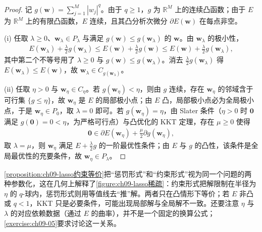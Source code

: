 \documentclass[../../main.tex]{subfiles}
\begin{document}
\begin{proof}
记 $g(\boldsymbol{w})=\sum_{j=1}^{M}|w_{j}|^{q}$。由于 $q\geqslant1$，$g$ 为 $\mathbb{R}^{M}$ 上的连续凸函数；由于 $E$ 为 $\mathbb{R}^{M}$ 上的有限凸函数，$E$ 连续，且其凸分析次微分 $\partial E(\boldsymbol{w})$ 在每点非空。

(i) 任取 $\lambda\geqslant0$、$\boldsymbol{w}_{\lambda}\in P_{\lambda}$ 与满足 $g(\boldsymbol{w})\leqslant g(\boldsymbol{w}_{\lambda})$ 的 $\boldsymbol{w}$。由 $\boldsymbol{w}_{\lambda}$ 的极小性，
\begin{align*}
E(\boldsymbol{w}_{\lambda})+\frac{\lambda}{2}g(\boldsymbol{w}_{\lambda})\leqslant E(\boldsymbol{w})+\frac{\lambda}{2}g(\boldsymbol{w})\leqslant E(\boldsymbol{w})+\frac{\lambda}{2}g(\boldsymbol{w}_{\lambda}),
\end{align*}
其中第二个不等号用了 $\lambda\geqslant0$ 与 $g(\boldsymbol{w})\leqslant g(\boldsymbol{w}_{\lambda})$。消去 $\frac{\lambda}{2}g(\boldsymbol{w}_{\lambda})$ 得 $E(\boldsymbol{w}_{\lambda})\leqslant E(\boldsymbol{w})$，故 $\boldsymbol{w}_{\lambda}\in C_{g(\boldsymbol{w}_{\lambda})}$。

(ii) 任取 $\eta>0$ 与 $\boldsymbol{w}_{\eta}\in C_{\eta}$。若 $g(\boldsymbol{w}_{\eta})<\eta$，则由 $g$ 连续，存在 $\boldsymbol{w}_{\eta}$ 的邻域含于可行集 $\{g\leqslant\eta\}$，故 $\boldsymbol{w}_{\eta}$ 是 $E$ 的局部极小点；由 $E$ 凸，局部极小点必为全局极小点，于是 $\boldsymbol{w}_{\eta}\in P_{0}$，取 $\lambda=0$ 即可。若 $g(\boldsymbol{w}_{\eta})=\eta$，由 Slater 条件（$\eta>0$ 时 $\boldsymbol{0}$ 满足 $g(\boldsymbol{0})=0<\eta$，为严格可行点）与凸优化的 KKT 定理，存在 $\mu\geqslant0$ 使得
\begin{align*}
\boldsymbol{0}\in\partial E(\boldsymbol{w}_{\eta})+\frac{\mu}{2}\partial g(\boldsymbol{w}_{\eta}),
\end{align*}
取 $\lambda=\mu$，则 $\boldsymbol{w}_{\eta}$ 满足 $E+\frac{\lambda}{2}g$ 的一阶最优性条件；由 $E$ 与 $g$ 的凸性，该条件是全局最优性的充要条件，故 $\boldsymbol{w}_{\eta}\in P_{\lambda}$。
\end{proof}

\begin{remark}\cref{proposition:ch09-lasso约束等价}把“惩罚形式”和“约束形式”视为同一个问题的两种参数化，这在几何上解释了\cref{figure:ch09-lasso稀疏}：约束形式把解限制在半径为 $\eta$ 的 $q$-球内，惩罚形式则用等值线去“推”解。两者只在凸情形下等价；若 $E$ 非凸或 $q<1$，KKT 只是必要条件，可能出现局部解与全局解不一致。还要注意 $\eta$ 与 $\lambda$ 的对应依赖数据（通过 $E$ 的曲率），并不是一个固定的换算公式；\cref{exercise:ch09-05}要求讨论这一关系。
\end{remark}
\end{document}
